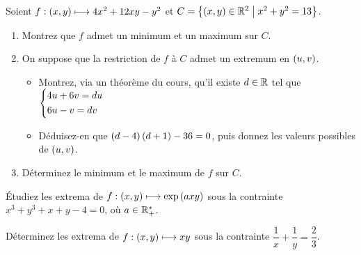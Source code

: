 \begin{exos}
Soient \(f:\left(x,y\right)\longmapsto4x^2+12xy-y^2\) et \(C=\left\lbrace\left(x,y\right)\in\mathbb{R}^2\;\middle|\; x^2+y^2=13\right\rbrace\).

\begin{enumerate}
    \item Montrez que \(f\) admet un minimum et un maximum sur \(C\). \\
    \item On suppose que la restriction de \(f\) à \(C\) admet un extremum en \(\left(u,v\right)\). \\ \begin{itemize}
        \item Montrez, via un théorème du cours, qu'il existe \(d\in\mathbb{R}\) tel que \(\begin{dcases}
            4u+6v=du \\
            6u-v=dv
        \end{dcases}\) \\
        \item Déduisez-en que \(\left(d-4\right)\left(d+1\right)-36=0\), puis donnez les valeurs possibles de \(\left(u,v\right)\). \\
    \end{itemize}
    \item Déterminez le minimum et le maximum de \(f\) sur \(C\).
\end{enumerate}
\end{exos}

\begin{exoss}
Étudiez les extrema de \(f:\left(x,y\right)\longmapsto\exp\left(axy\right)\) sous la contrainte \(x^3+y^3+x+y-4=0\), où \(a\in\mathbb{R}_+^*\).
\end{exoss}

\begin{exoss}
Déterminez les extrema de \(f:\left(x,y\right)\longmapsto xy\) sous la contrainte \(\dfrac{1}{x}+\dfrac{1}{y}=\dfrac{2}{3}\).
\end{exoss}

